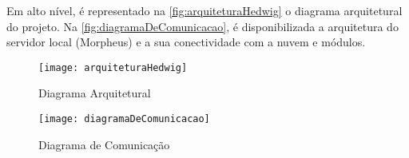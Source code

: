Em alto nível, é representado na \autoref{fig:arquiteturaHedwig} o diagrama arquitetural do projeto. Na \autoref{fig:diagramaDeComunicacao}, é disponibilizada a arquitetura do servidor local (Morpheus) e a sua conectividade com a nuvem e módulos.

\begin{figure}[H]
	\caption{\label{fig:arquiteturaHedwig}Diagrama Arquitetural}
	\begin{center}
	    \texttt{[image: arquiteturaHedwig]}
	\end{center}
\end{figure}

\begin{figure}[H]
	\caption{\label{fig:diagramaDeComunicacao}Diagrama de Comunicação}
	\begin{center}
	    \texttt{[image: diagramaDeComunicacao]}
	\end{center}
\end{figure}

